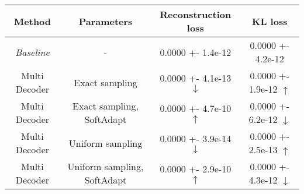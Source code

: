 \centering
\scriptsize
\begin{tabular}{||c|c|c|c||}
\hline
 Method & Parameters & Reconstruction loss & KL loss \\
\hline
\textit{Baseline} & - & 0.0000 +- 1.4e-12 & 0.0000 +- 4.2e-12 \\
\hline
Multi Decoder & Exact sampling & 0.0000 +- 4.1e-13  $\downarrow$ & 0.0000 +- 1.9e-12  $\uparrow$ \\
\hline
Multi Decoder & Exact sampling, SoftAdapt & 0.0000 +- 4.7e-10  $\uparrow$ & 0.0000 +- 6.2e-12  $\downarrow$ \\
\hline
Multi Decoder & Uniform sampling & 0.0000 +- 3.9e-14  $\downarrow$ & 0.0000 +- 2.5e-13  $\uparrow$ \\
\hline
Multi Decoder & Uniform sampling, SoftAdapt & 0.0000 +- 2.9e-10  $\uparrow$ & 0.0000 +- 4.3e-12  $\downarrow$ \\
\hline
\end{tabular}

